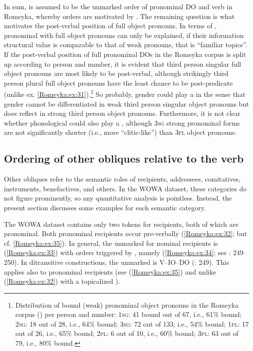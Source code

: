 \documentclass[output=paper,colorlinks,citecolor=brown]{langscibook}
\begin{document}
In sum,  is assumed to be the unmarked order of pronominal DO and verb in Romeyka, whereby  orders are motivated by . The remaining question is what motivates the post-verbal position of full object pronouns. In terms of , pronominal  with full object pronouns can only be explained, if their information structural value is comparable to that of weak  pronouns, that is ``familiar topics''. If the post-verbal position of full pronominal DOs in the Romeyka corpus is split up according to person and number, it is evident that third person singular full object pronouns are most likely to be post-verbal, although strikingly third person plural full object pronouns have the least chance to be post-predicate (unlike ex. \ref{Romeyka:ex:31}).\footnote{Distribution of bound (weak) pronominal object pronouns in the Romeyka corpus (\citealt{schreiber_inprep}) per person and number: \textsc{1sg}: 41 bound out of 67, i.e., 61\% bound; \textsc{2sg}: 18 out of 28, i.e., 64\% bound; \textsc{3sg}: 72 out of 133; i.e., 54\% bound; \textsc{1pl}: 17 out of 26, i.e., 65\% bound; \textsc{2pl}: 6 out of 10, i.e., 60\% bound; \textsc{3pl}: 63 out of 79, i.e., 80\% bound.} So probably, gender could play a  in the sense that gender cannot be differentiated in weak third person singular object pronouns but does reflect in strong third person object pronouns. Furthermore, it is not clear whether phonological  could also play a , although \textsc{3sg} strong pronominal forms are not significantly shorter (i.e., more ``clitic-like'') than \textsc{3pl} object pronouns.

\subsection{Ordering of other obliques relative to the verb}\label{Romeyka:ss:4.5}

Other obliques refer to the semantic roles of recipients, addressees, comitatives, instruments, benefactives, and others. In the WOWA dataset, these categories do not figure prominently, so any quantitative analysis is pointless. Instead, the present section discusses some examples for each semantic category.

The WOWA dataset contains only two tokens for recipients, both of which are pronominal. Both pronominal recipients occur pre-verbally (\ref{Romeyka:ex:32}; but cf. \ref{Romeyka:ex:35}). In general, the unmarked  for nominal recipients is  (\ref{Romeyka:ex:33}) with  orders triggered by , namely  (\ref{Romeyka:ex:34}; see \citealt{schreibergrammar2022}: 249--250). In ditransitive constructions, the unmarked  is V--IO--DO (\citealt{schreibergrammar2022}: 249). This applies also to pronominal recipients (see (\ref{Romeyka:ex:35}) and unlike (\ref{Romeyka:ex:32}) with a topicalized  ). 
\end{document}
